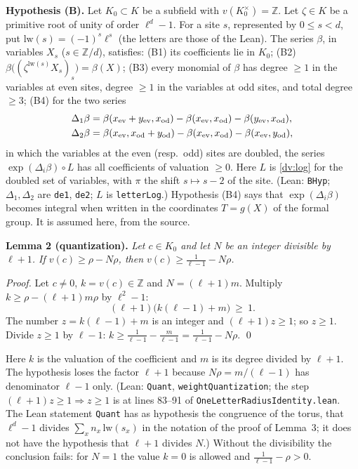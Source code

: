 \documentclass[11pt,letterpaper]{article}
\newcommand{\Z}{\mathbb Z}\newcommand{\Q}{\mathbb Q}\newcommand{\C}{\mathbb C}
\begin{document}
\textbf{Hypothesis (B).} Let $K_0\subset K$ be a subfield with $v(K_0^\times)=\Z$. Let $\zeta\in K$ be a
primitive root of unity of order $\ell^d-1$. For a site $s$, represented by $0\le s<d$, put
$\mathrm{lw}(s)=(-1)^s\ell^s$ (the letters are those of the Lean). The series $\beta$, in variables $X_s$ ($s\in\Z/d$), satisfies:
(B1) its coefficients lie in $K_0$; (B2) $\beta\big((\zeta^{\mathrm{lw}(s)}X_s)_s\big)=\beta(X)$; (B3) every
monomial of $\beta$ has degree $\ge1$ in the variables at even sites, degree $\ge1$ in the variables at odd
sites, and total degree $\ge3$; (B4) for the two series
\begin{equation}\label{dv:de}
\begin{aligned}
 \Delta_1\beta&=\beta(x_{\rm ev}+y_{\rm ev},x_{\rm od})-\beta(x_{\rm ev},x_{\rm od})-\beta(y_{\rm ev},x_{\rm od}),\\
 \Delta_2\beta&=\beta(x_{\rm ev},x_{\rm od}+y_{\rm od})-\beta(x_{\rm ev},x_{\rm od})-\beta(x_{\rm ev},y_{\rm od}),
\end{aligned}
\end{equation}
in which the variables at the even (resp.\ odd) sites are doubled, the series
$\exp(\Delta_i\beta)\circ L$ has all coefficients of valuation $\ge0$. Here $L$ is \eqref{dv:log} for the
doubled set of variables, with $\pi$ the shift $s\mapsto s-2$ of the site. (Lean: \texttt{BHyp};
$\Delta_1,\Delta_2$ are \texttt{de1}, \texttt{de2}; $L$ is \texttt{letterLog}.) Hypothesis (B4) says that
$\exp(\Delta_i\beta)$ becomes integral when written in the coordinates $T=g(X)$ of the formal group. It is
assumed here, from the source.

\textbf{Lemma 2 (quantization).} \emph{Let $c\in K_0$ and let $N$ be an integer divisible by $\ell+1$. If
$v(c)\ge\rho-N\rho$, then $v(c)\ge\frac1{\ell-1}-N\rho$.}

\emph{Proof.} Let $c\ne0$, $k=v(c)\in\Z$ and $N=(\ell+1)m$. Multiply $k\ge\rho-(\ell+1)m\rho$ by $\ell^2-1$:
\begin{equation}\label{dv:quant}
 (\ell+1)\big(k(\ell-1)+m\big)\ \ge\ 1 .
\end{equation}
The number $z=k(\ell-1)+m$ is an integer and $(\ell+1)z\ge1$; so $z\ge1$. Divide $z\ge1$ by $\ell-1$:
$k\ge\frac1{\ell-1}-\frac m{\ell-1}=\frac1{\ell-1}-N\rho$. \qed

\noindent Here $k$ is the valuation of the coefficient and $m$ is its degree divided by $\ell+1$. The
hypothesis loses the factor $\ell+1$ because $N\rho=m/(\ell-1)$ has denominator $\ell-1$ only. (Lean:
\texttt{Quant}, \texttt{weightQuantization}; the step $(\ell+1)z\ge1\Rightarrow z\ge1$ is at lines 83--91 of
\texttt{OneLetterRadiusIdentity.lean}. The Lean statement \texttt{Quant} has as hypothesis the congruence
of the torus, that $\ell^d-1$ divides $\sum_xn_x\,\mathrm{lw}(s_x)$ in the notation of the proof of Lemma~3;
it does not have the hypothesis that $\ell+1$ divides $N$.) Without the divisibility the conclusion fails: for $N=1$ the value
$k=0$ is allowed and $\frac1{\ell-1}-\rho>0$.
\end{document}
